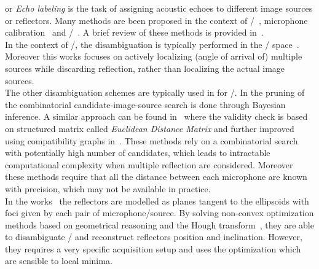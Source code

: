  or \textit{Echo labeling} is the task of assigning acoustic echoes to different image sources or reflectors.
Many methods are been proposed in the context of \SSL/~, microphone calibration~
and \RooGE/~.
A brief review of these methods is provided in~.
\\In the context of \SSL/, the disambiguation is typically performed in the \TDOAs/ space~.
Moreover this works focuses on actively localizing (angle of arrival of) multiple sources while discarding reflection, rather than localizing the actual image sources.
\\The other disambiguation schemes are typically used in for \RooGE/.
In  the pruning of the combinatorial candidate-image-source search is done through Bayesian inference.
A similar approach can be found in~ where the validity check is based on structured matrix called \textit{Euclidean Distance Matrix} and further improved using compatibility graphs in~.
These methods rely on a combinatorial search with potentially high number of candidates, which leads to intractable computational complexity when multiple reflection are considered.
Moreover these methods require that all the distance between each microphone are known with precision, which may not be available in practice.
\\In the works~ the reflectors are modelled as planes tangent to the ellipsoids with foci given by each pair of microphone/source.
By solving non-convex optimization methods based on geometrical reasoning and the Hough transform~, they are able to disambiguate \TOAs/ and reconstruct reflectors position and inclination.
However, they requires a very specific acquisition setup and uses the optimization which are sensible to local minima.
